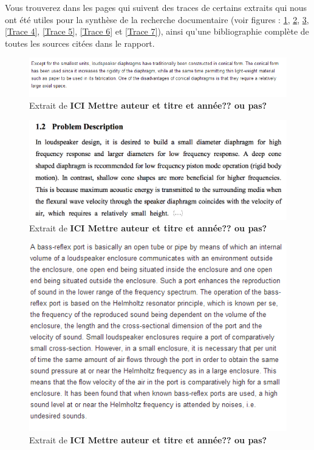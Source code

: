 Vous trouverez dans les pages qui suivent des traces de certains extraits qui nous ont été utiles pour la synthèse de la recherche documentaire (voir figures : \ref{Trace 1}, \ref{Trace 2}, \ref{Trace 3}, \ref{Trace 4}, \ref{Trace 5}, \ref{Trace 6} et \ref{Trace 7}), ainsi qu'une bibliographie complète de toutes les sources citées dans le rapport.

\begin{figure}[b]
\begin{center}
\includegraphics[scale=0.8]{img/Trace1-brevet US 3153463.png}
\end{center}
\caption{Extrait de \cite{f1964compound} \textbf{ICI Mettre auteur et titre et année?? ou pas?}} %
\label{Trace 1}
\end{figure}

\begin{figure}[b]
\begin{center}
\includegraphics[scale=0.35]{img/Trace2-Miller.png}
\end{center}
\caption{Extrait de \cite[p.~2]{Miller} \textbf{ICI Mettre auteur et titre et année?? ou pas?}} %
 \label{Trace 2}
\end{figure}

\begin{figure}[b]
\begin{center}
\includegraphics{img/Trace 3-US6275597.png}
\end{center}
\caption{Extrait de \cite{US6275597} \textbf{ICI Mettre auteur et titre et année?? ou pas?}} %
 \label{Trace 3}
\end{figure}

